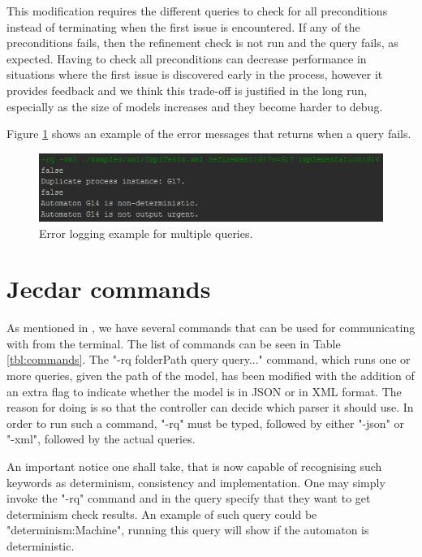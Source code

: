 This modification requires the different queries to check for all preconditions instead of terminating when the first issue is encountered. If any of the preconditions fails, then the refinement check is not run and the query fails, as expected. Having to check all preconditions can decrease performance in situations where the first issue is discovered early in the process, however it provides feedback and we think this trade-off is justified in the long run, especially as the size of models increases and they become harder to debug.

Figure \ref{fig:errLog} shows an example of the error messages that \jecdar returns when a query fails.

\begin{figure}
    \centering
    \includegraphics[scale = 0.7]{figures/ErrorMessages.png}
    \caption{Error logging example for multiple queries.}
    \label{fig:errLog}
\end{figure}

\section{Jecdar commands}
As mentioned in \textcite{Jecdar:2019}, we have several commands that can be used for communicating with \jecdar from the terminal. The list of commands can be seen in Table \ref{tbl:commands}. The "-rq folderPath query query..." command, which runs one or more queries, given the path of the model, has been modified with the addition of an extra flag to indicate whether the model is in JSON or in XML format. The reason for doing is so that the controller can decide which parser it should use. In order to run such a command, "-rq" must be typed, followed by either "-json" or "-xml", followed by the actual queries.

An important notice one shall take, that \jecdar is now capable of recognising such keywords as determinism, consistency and implementation. One may simply invoke the "-rq" command and in the query specify that they want to get determinism check results. An example of such query could be "determinism:Machine", running this query will show if the automaton is deterministic.

